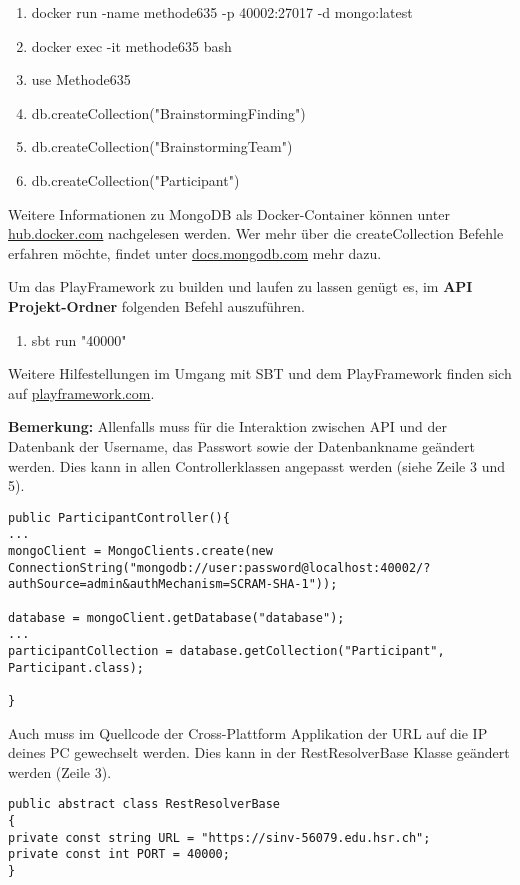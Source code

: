 \begin{enumerate}
  \item docker run -name methode635 -p 40002:27017 -d mongo:latest
  \item docker exec -it methode635 bash
  \item use Methode635
  \item db.createCollection("BrainstormingFinding")
  \item db.createCollection("BrainstormingTeam")
  \item db.createCollection("Participant")
\end{enumerate}
Weitere Informationen zu MongoDB als Docker-Container können unter \href{https://hub.docker.com/_/mongo/}{hub.docker.com} nachgelesen werden. Wer mehr über die createCollection Befehle erfahren möchte, findet unter \href{https://docs.mongodb.com/manual/reference/method/db.createCollection/index.html}{docs.mongodb.com} mehr dazu.

Um das PlayFramework zu builden und laufen zu lassen genügt es, im \textbf{API Projekt-Ordner} folgenden Befehl auszuführen.

\begin{enumerate}
  \item sbt run "40000"
\end{enumerate}
Weitere Hilfestellungen im Umgang mit SBT und dem PlayFramework finden sich auf \href{https://www.playframework.com/documentation/2.6.x/PlayConsole}{playframework.com}.

\textbf{Bemerkung:} Allenfalls muss für die Interaktion zwischen API und der Datenbank der Username, das Passwort sowie der Datenbankname geändert werden. Dies kann in allen Controllerklassen angepasst werden (siehe Zeile 3 und 5).

\lstset{language=JAVA, showstringspaces=false, frame=single, captionpos=b, label=createParticipant, breaklines=true, numbers=left}
\begin{lstlisting}[caption={Verbindung zur MongoDB}, label=DBVerbindung]
public ParticipantController(){
...
mongoClient = MongoClients.create(new ConnectionString("mongodb://user:password@localhost:40002/?authSource=admin&authMechanism=SCRAM-SHA-1"));

database = mongoClient.getDatabase("database");
...
participantCollection = database.getCollection("Participant", Participant.class);

}
\end{lstlisting}

Auch muss im Quellcode der Cross-Plattform Applikation der URL auf die IP deines PC gewechselt werden. Dies kann in der RestResolverBase Klasse geändert werden (Zeile 3).

\begin{lstlisting}[caption={Verbindung zum API}, label=APIVerbindung]
public abstract class RestResolverBase
{
private const string URL = "https://sinv-56079.edu.hsr.ch";
private const int PORT = 40000;
}

\end{lstlisting}
